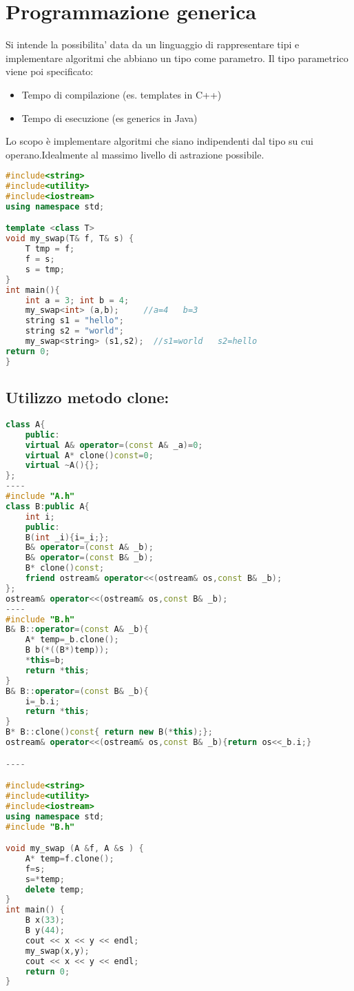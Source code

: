 \section{Programmazione generica}
Si intende la possibilita’ data da un linguaggio di
rappresentare tipi e implementare algoritmi che
abbiano un tipo come parametro.
Il tipo parametrico viene poi specificato:
\begin{itemize}
    \item Tempo di compilazione (es. templates in C++)
    \item Tempo di esecuzione (es generics in Java)
\end{itemize}

Lo scopo è implementare algoritmi che siano
indipendenti dal tipo su cui operano.Idealmente al massimo livello di astrazione possibile.

\begin{lstlisting}[language=c++]
#include<string>
#include<utility>
#include<iostream>
using namespace std;

template <class T>
void my_swap(T& f, T& s) {
    T tmp = f;
    f = s;
    s = tmp;
}
int main(){
    int a = 3; int b = 4;
    my_swap<int> (a,b);     //a=4   b=3
    string s1 = "hello";
    string s2 = "world";
    my_swap<string> (s1,s2);  //s1=world   s2=hello
return 0;
}
\end{lstlisting}

\subsection{Utilizzo metodo clone:}
\begin{lstlisting}[language=c++]
class A{
    public:
    virtual A& operator=(const A& _a)=0;
    virtual A* clone()const=0;
    virtual ~A(){};
};
----
#include "A.h"
class B:public A{
    int i;
    public:
    B(int _i){i=_i;};
    B& operator=(const A& _b);
    B& operator=(const B& _b);
    B* clone()const;
    friend ostream& operator<<(ostream& os,const B& _b);
};
ostream& operator<<(ostream& os,const B& _b); 
----
#include "B.h"
B& B::operator=(const A& _b){
    A* temp=_b.clone();
    B b(*((B*)temp));
    *this=b;
    return *this;
}
B& B::operator=(const B& _b){
    i=_b.i;
    return *this;
}
B* B::clone()const{ return new B(*this);};
ostream& operator<<(ostream& os,const B& _b){return os<<_b.i;}

----

#include<string>
#include<utility>
#include<iostream>
using namespace std;
#include "B.h"

void my_swap (A &f, A &s ) {
    A* temp=f.clone();
    f=s;
    s=*temp;
    delete temp;
}
int main() {
    B x(33);
    B y(44);
    cout << x << y << endl;
    my_swap(x,y);
    cout << x << y << endl;
    return 0;
}
\end{lstlisting}